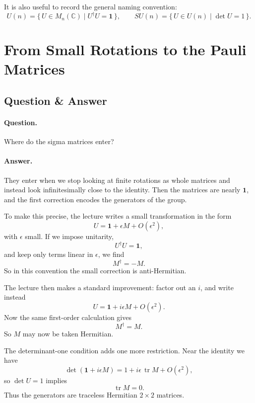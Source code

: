 It is also useful to record the general naming convention:
\begin{equation}
U(n)=\{\,U\in M_n(\mathbb C)\mid U^\dagger U=\mathbf 1\,\},
\qquad
SU(n)=\{\,U\in U(n)\mid \det U=1\,\}.
\end{equation}

\section{From Small Rotations to the Pauli Matrices}

\subsection{Question \& Answer}

\paragraph{Question.} Where do the sigma matrices enter?

\paragraph{Answer.} They enter when we stop looking at finite rotations as whole matrices and instead look infinitesimally close to the identity. Then the matrices are nearly \(\mathbf 1\), and the first correction encodes the generators of the group.

To make this precise, the lecture writes a small transformation in the form
\begin{equation}
U=\mathbf 1+\epsilon M+O(\epsilon^2),
\end{equation}
with \(\epsilon\) small. If we impose unitarity,
\[
U^\dagger U=\mathbf 1,
\]
and keep only terms linear in \(\epsilon\), we find
\begin{equation}
M^\dagger=-M.
\end{equation}
So in this convention the small correction is anti-Hermitian.

The lecture then makes a standard improvement: factor out an \(i\), and write instead
\begin{equation}
U=\mathbf 1+i\epsilon M+O(\epsilon^2).
\end{equation}
Now the same first-order calculation gives
\begin{equation}
M^\dagger=M.
\end{equation}
So \(M\) may now be taken Hermitian.

The determinant-one condition adds one more restriction. Near the identity we have
\begin{equation}
\det(\mathbf 1+i\epsilon M)=1+i\epsilon\,\operatorname{tr}M+O(\epsilon^2),
\end{equation}
so \(\det U=1\) implies
\begin{equation}
\operatorname{tr}M=0.
\end{equation}
Thus the generators are traceless Hermitian \(2\times 2\) matrices.

